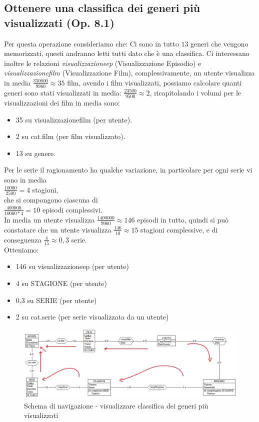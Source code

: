 \documentclass[a4paper,12pt]{report}
\begin{document}
\subsection{Ottenere una classifica dei generi più visualizzati (Op. 8.1)} \label{ss:op81}
Per questa operazione consideriamo che: Ci sono in tutto $13$ generi che vengono memorizzati, questi andranno letti tutti dato che è una classifica. Ci interessano inoltre le relazioni \textit{visualizzazioneep} (Visualizzazione Episodio) e \textit{visualizzazionefilm} (Visualizzazione Film), complessivamente, un utente visualizza in media $\frac{350000}{9960} \approx 35$ film, avendo i film visualizzati, possiamo calcolare quanti generi sono stati visualizzati in media: $\frac{23500}{9500} \approx 2$, ricapitolando i volumi per le visualizzazioni dei film in media sono:
\begin{itemize}
	\item 35 su visualizzazionefilm (per utente).
	\item 2 su cat.film (per film visualizzato).
	\item 13 su genere.
\end{itemize}
Per le serie il ragionamento ha qualche variazione, in particolare per ogni serie vi sono in media \\ $\frac{10000}{2500} = 4$ stagioni,\\ che si compongono ciascuna di \\ $\frac{400000}{10000 * 4} = 10$ episodi complessivi.\\ In media un utente visualizza $\frac{1400000}{9960} \approx 146$ episodi in tutto, quindi si può constatare che un utente visualizza $\frac{146}{10} \approx 15$ stagioni complessive, e di conseguenza $\frac{4}{15} \approx 0,3$ serie.\\
Otteniamo:
\begin{itemize}
	\item 146 su visualizzazioneep (per utente)
	\item 4 su STAGIONE (per utente)
	\item 0,3 su SERIE (per utente)
	\item 2 su cat.serie (per serie visualizzata da un utente)
\end{itemize}
\begin{figure}[H]
	\centering
	\includegraphics[width=450pt]{ER/navigazione/classificageneri.png}
	\caption{Schema di navigazione - visualizzare classifica dei generi più visualizzati}
\end{figure}
\end{document}
